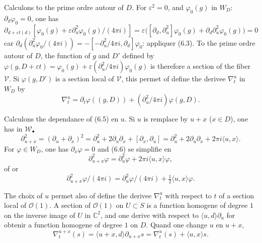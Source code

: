 \documentclass[12pt,a4paper]{article}
\theoremstyle{plain}
\theoremstyle{definition}
\theoremstyle{remark}
\begin{document}
Calculons to the prime ordre autour of $D$. For $\varepsilon^2 = 0$, and $\varphi_0(g)$ in $W_D$: $\partial_d\varphi_0 = 0$, one has
\[\partial_{d + \varepsilon t(d)}[\varphi_0(g) + \varepsilon\partial_u^2\varphi_0(g)/(4\pi i)] = \varepsilon\bigl([\partial_d, \partial_u^2]\varphi_0(g) + \partial_d\partial_u^2\varphi_0(g)\bigr) = 0\]
car $\partial_d(\partial_u^2\varphi_0/(4\pi i)) = -[-\partial_u^2/4\pi i, \partial_d]\varphi_0$: appliquer (6.3). To the prime ordre autour of $D$, the function of $g$ and $D'$ defined by $\varphi(g, D + \varepsilon t) = \varphi_0(g) + \varepsilon(\partial_u^2/4\pi i)\varphi_0(g)$ is therefore a section of the fiber $\mathscr{V}$. Si $\varphi(g, D')$ is a section local of $\mathscr{V}$, this permet of define the derivee $\nabla_t^u$ in $W_D$ by
\begin{equation}\label{eq:6.5}
\nabla_t^u = \partial_t\varphi((g, D)) + (\partial_u^2/4\pi i)\varphi(g, D).\tag{6.5}
\end{equation}

Calculons the dependance of (6.5) en $u$. Si $u$ is remplace by $u + x$ ($x \in D$), one has in $\mathscr{W}_\bullet$
\begin{equation}\label{eq:6.6}
\partial_{u+x}^2 = (\partial_u + \partial_x)^2 = \partial_u^2 + 2\partial_u\partial_x + [\partial_x, \partial_u] = \partial_u^2 + 2\partial_u\partial_x + 2\pi i\langle u, x \rangle.\tag{6.6}
\end{equation}
For $\varphi \in W_D$, one has $\partial_x\varphi = 0$ and (6.6) se simplifie en
\begin{equation}\label{eq:6.7}
\partial_{u+x}^2\varphi = \partial_u^2\varphi + 2\pi i\langle u, x \rangle\varphi,\tag{6.7}
\end{equation}
of or
\begin{equation}\label{eq:6.8}
\partial_{u+x}^2\varphi/(4\pi i) = \partial_u^2\varphi/(4\pi i) + \tfrac{1}{2}\langle u, x \rangle\varphi.\tag{6.8}
\end{equation}

The choix of $u$ permet also of define the derivee $\nabla_t^u$ with respect to $t$ of a section local of $\mathcal{O}(1)$. A section of $\mathcal{O}(1)$ on $U \subset S$ is a function homogene of degree $1$ on the inverse image of $U$ in $\mathbb{C}^2$, and one derive with respect to $\langle u, d \rangle\partial_u$ for obtenir a function homogene of degree $1$ on $D$. Quand one change $u$ en $u + x$,
\[\nabla_t^{u+x}(s) = \langle u + x, d \rangle\partial_{u+x}s = \nabla_t^u(s) + \langle u, x \rangle s.\]
\end{document}
